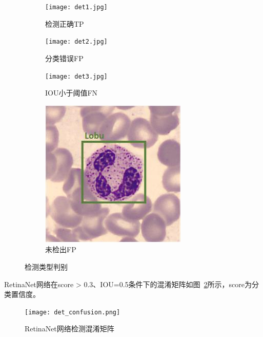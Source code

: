 \begin{figure}[htbp]
	\centering
	\begin{subfigure}{0.24\linewidth}
		\centering
		\texttt{[image: det1.jpg]}
    \caption{检测正确TP}
	\end{subfigure}
	\centering
	\begin{subfigure}{0.24\linewidth}
		\centering
		\texttt{[image: det2.jpg]}
    \caption{分类错误FP}
	\end{subfigure}
	\centering
	\begin{subfigure}{0.24\linewidth}
		\centering
		\texttt{[image: det3.jpg]}
    \caption{IOU小于阈值FN}
	\end{subfigure}
	\centering
	\begin{subfigure}{0.24\linewidth}
		\centering
		\includegraphics[width=0.95\linewidth, height=0.95\linewidth]{det4.jpg}
    \caption{未检出FP}
	\end{subfigure}
	\caption{检测类型判别}
	\label{fig:confusion}
\end{figure}

RetinaNet网络在score > 0.3、IOU=0.5条件下的混淆矩阵如图~\ref{fig:det_confusion}所示，score为分类置信度。

\begin{figure}                  
  \centering                   
  \texttt{[image: det\_confusion.png]}                   
  \caption{RetinaNet网络检测混淆矩阵}                   
  \label{fig:det_confusion}      
\end{figure}   




